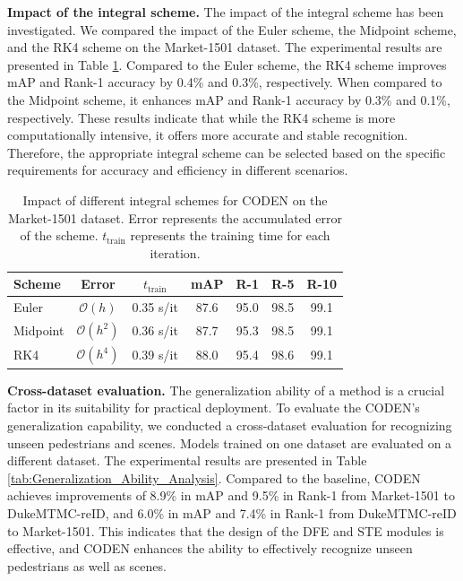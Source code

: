 \documentclass[12pt]{spieman}  %
\begin{document}
\begin{spacing}{2}
		\textbf{Impact of the integral scheme.} The impact of the integral scheme has been investigated. We compared the impact of the Euler scheme, the Midpoint scheme, and the RK4 scheme on the Market-1501 dataset. The experimental results are presented in Table \ref{tab:integral_scheme}. Compared to the Euler scheme, the RK4 scheme improves mAP and Rank-1 accuracy by 0.4\% and 0.3\%, respectively. When compared to the Midpoint scheme, it enhances mAP and Rank-1 accuracy by 0.3\% and 0.1\%, respectively. These results indicate that while the RK4 scheme is more computationally intensive, it offers more accurate and stable recognition. Therefore, the appropriate integral scheme can be selected based on the specific requirements for accuracy and efficiency in different scenarios.
		
		\begin{table}[h]
			\caption{Impact of different integral schemes for CODEN on the Market-1501 dataset. Error represents the accumulated error of the scheme. $t_{\text{train}}$ represents the training time for each iteration.}
			\label{tab:integral_scheme}
			\begin{tabular*}{\textwidth}{@{\extracolsep\fill}lcccccc}
				\toprule%
				Scheme & Error & $t_{\text{train}}$ & mAP & R-1  & R-5  & R-10 \\
				\midrule
				Euler  & $\mathcal{O}(h)$  & 0.35 s/it  & 87.6  &95.0 & 98.5 & 99.1  \\
				Midpoint  & $\mathcal{O}(h^2)$  & 0.36 s/it & 87.7  & 95.3 & 98.5 & 99.1    \\
				RK4  & $\mathcal{O}(h^4)$  & 0.39 s/it &  88.0  &95.4 &98.6  & 99.1    \\
				\bottomrule
			\end{tabular*}
		\end{table}
		
		\textbf{Cross-dataset evaluation.} The generalization ability of a method is a crucial factor in its suitability for practical deployment. To evaluate the CODEN's generalization capability, we conducted a cross-dataset evaluation for recognizing unseen pedestrians and scenes. Models trained on one dataset are evaluated on a different dataset. The experimental results are presented in Table \ref{tab:Generalization_Ability_Analysis}. Compared to the baseline, CODEN achieves improvements of 8.9\% in mAP and 9.5\% in Rank-1 from Market-1501 to DukeMTMC-reID, and 6.0\% in mAP and 7.4\% in Rank-1 from DukeMTMC-reID to Market-1501. This indicates that the design of the DFE and STE modules is effective, and CODEN enhances the ability to effectively recognize unseen pedestrians as well as scenes.
		

\end{spacing}
\end{document}
